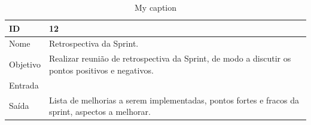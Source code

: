 \begin{table}[\htp]
\centering
\caption{My caption}
\label{my-label}
\begin{tabular}{|l|l|}
\hline
ID       & 12                                           \\ \hline
Nome     & Retrospectiva da Sprint. \\ \hline
Objetivo & Realizar reunião de retrospectiva da Sprint, de modo a discutir os pontos positivos e negativos.
 \\ \hline
Entrada  & \\ \hline
Saída    &  Lista de melhorias a serem implementadas, pontos fortes e fracos da sprint, aspectos a melhorar.\\ \hline
\end{tabular}
\end{table}
